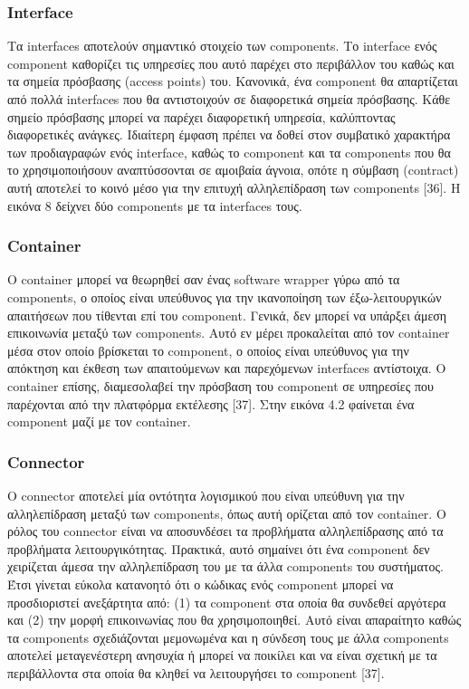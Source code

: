 \subsubsection{Interface}

	Τα interfaces αποτελούν σημαντικό στοιχείο των components. Το interface ενός component καθορίζει τις υπηρεσίες που αυτό παρέχει στο περιβάλλον του καθώς και τα σημεία πρόσβασης (access points) του. Κανονικά, ένα component θα απαρτίζεται από πολλά interfaces που θα αντιστοιχούν σε διαφορετικά σημεία πρόσβασης. Κάθε σημείο πρόσβασης μπορεί να παρέχει διαφορετική υπηρεσία, καλύπτοντας διαφορετικές ανάγκες. Ιδιαίτερη έμφαση πρέπει να δοθεί στον συμβατικό χαρακτήρα των προδιαγραφών ενός interface, καθώς το component και τα components που θα το χρησιμοποιήσουν αναπτύσσονται σε αμοιβαία άγνοια, οπότε η σύμβαση (contract) αυτή αποτελεί το κοινό μέσο για την επιτυχή αλληλεπίδραση των components [36]. Η εικόνα 8 δείχνει δύο components με τα interfaces τους.
	
\subsubsection{Container}

	Ο container μπορεί να θεωρηθεί σαν ένας software wrapper γύρω από τα components, ο οποίος είναι υπεύθυνος για την ικανοποίηση των έξω-λειτουργικών απαιτήσεων που τίθενται επί του component. Γενικά, δεν μπορεί να υπάρξει άμεση επικοινωνία μεταξύ των components. Αυτό εν μέρει προκαλείται από τον container μέσα στον οποίο βρίσκεται το component, ο οποίος είναι υπεύθυνος για την απόκτηση και έκθεση των απαιτούμενων και παρεχόμενων interfaces αντίστοιχα. Ο container επίσης, διαμεσολαβεί την πρόσβαση του component σε υπηρεσίες που παρέχονται από την πλατφόρμα εκτέλεσης [37]. Στην εικόνα 4.2 φαίνεται ένα component μαζί με τον container.
	
\subsubsection{Connector}

Ο connector αποτελεί μία οντότητα λογισμικού που είναι υπεύθυνη για την αλληλεπίδραση μεταξύ των components, όπως αυτή ορίζεται από τον container. Ο ρόλος του connector είναι να αποσυνδέσει τα προβλήματα αλληλεπίδρασης από τα προβλήματα λειτουργικότητας. Πρακτικά, αυτό σημαίνει ότι ένα component δεν χειρίζεται άμεσα την αλληλεπίδραση του με τα άλλα components του συστήματος. Έτσι γίνεται εύκολα κατανοητό ότι ο κώδικας ενός component μπορεί να προσδιοριστεί ανεξάρτητα από: (1) τα component στα οποία θα συνδεθεί αργότερα και (2) την μορφή επικοινωνίας που θα χρησιμοποιηθεί. Αυτό είναι απαραίτητο καθώς τα components σχεδιάζονται μεμονωμένα και η σύνδεση τους με άλλα components αποτελεί μεταγενέστερη ανησυχία ή μπορεί να ποικίλει και να είναι σχετική με τα περιβάλλοντα στα οποία θα κληθεί να λειτουργήσει το component [37].


